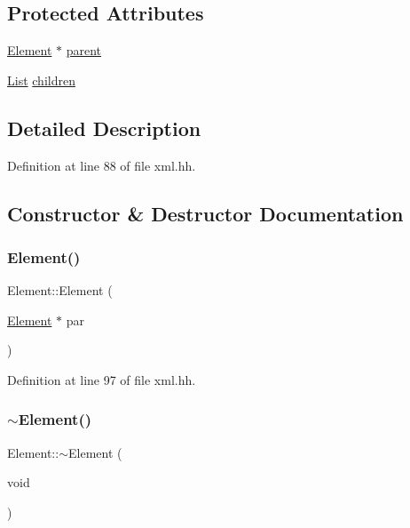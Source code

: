\subsection*{Protected Attributes}
\begin{DoxyCompactItemize}
\item 
\mbox{\hyperlink{class_element}{Element}} $\ast$ \mbox{\hyperlink{class_element_ae9b2bd00c9ba7a16c9981142c9e41fe3}{parent}}
\item 
\mbox{\hyperlink{xml_8hh_ab5ab62f46b3735557c125f91b40ac155}{List}} \mbox{\hyperlink{class_element_a74557a312f8a7edfca63321f31fdad8d}{children}}
\end{DoxyCompactItemize}


\subsection{Detailed Description}


Definition at line 88 of file xml.\+hh.



\subsection{Constructor \& Destructor Documentation}
\mbox{\label{class_element_a4b15c730a1f2705efc3f302ebf850649}} 
\subsubsection{\texorpdfstring{Element()}{Element()}}
{\footnotesize\ttfamily Element\+::\+Element (\begin{DoxyParamCaption}\item[{\mbox{\hyperlink{class_element}{Element}} $\ast$}]{par }\end{DoxyParamCaption})\hspace{0.3cm}{\ttfamily [inline]}}



Definition at line 97 of file xml.\+hh.

\mbox{\label{class_element_a2d1e1ab54ade3240c7fd99773de13d24}} 
\subsubsection{\texorpdfstring{$\sim$Element()}{~Element()}}
{\footnotesize\ttfamily Element\+::$\sim$\+Element (\begin{DoxyParamCaption}\item[{void}]{ }\end{DoxyParamCaption})}



